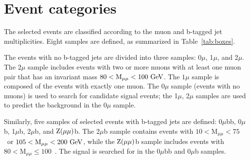{{\section{Event categories}\label{sec:sampleDef}

The selected events are classified according to the muon and
b-tagged jet multiplicities.  Eight samples are defined, as summarized
in Table~\ref{tab:boxes}.

The events with no b-tagged jets are divided into three samples: 0$\mu$,
1$\mu$, and 2$\mu$. The 2$\mu$ sample includes events with two or more
muons with at least one muon pair that has an invariant
mass $80 < \mathrm{M}_{\mu\mu} <100~\textrm{GeV}$. The $1\mu$ sample is
composed of the events with exactly one muon. The $0\mu$ sample
(events with no muons) is used
to search for candidate signal events; the 1$\mu$, 2$\mu$ samples are used to predict
the background in the 0$\mu$ sample.

Similarly, five samples of selected events with b-tagged jets are
defined: 0$\mu$bb, 0$\mu$b, 1$\mu$b, 2$\mu$b, and
$\textrm{Z}(\mu\mu)$b. The 2$\mu$b sample contains events with $10<
\mathrm{M}_{\mu\mu} <75$~\GeV or $105< \mathrm{M}_{\mu\mu} <200~\textrm{GeV}$,
while the $\textrm{Z}(\mu\mu)$b sample includes events with $80<
\mathrm{M}_{\mu\mu} \leq 100$~\GeV. The signal is searched for in the
0$\mu$bb and 0$\mu$b samples.

}}
